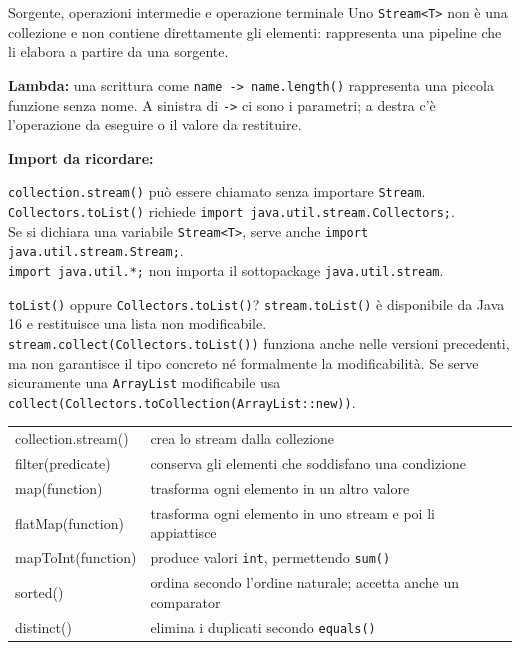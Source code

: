 ﻿\documentclass[10pt,a4paper]{article}
\newcommand{\cmd}[1]{\texttt{#1}}
\begin{document}
\begin{concept}{Sorgente, operazioni intermedie e operazione terminale}
Uno \cmd{Stream<T>} non è una collezione e non contiene direttamente gli
elementi: rappresenta una pipeline che li elabora a partire da una sorgente.

\textbf{Lambda:} una scrittura come \cmd{name -> name.length()} rappresenta
una piccola funzione senza nome. A sinistra di \cmd{->} ci sono i parametri;
a destra c'è l'operazione da eseguire o il valore da restituire.

\textbf{Import da ricordare:}

\cmd{collection.stream()} può essere chiamato senza importare \cmd{Stream}.\\
\cmd{Collectors.toList()} richiede
\cmd{import java.util.stream.Collectors;}.\\
Se si dichiara una variabile \cmd{Stream<T>}, serve anche
\cmd{import java.util.stream.Stream;}.\\
\cmd{import java.util.*;} non importa il sottopackage \cmd{java.util.stream}.

\begin{examtrap}{\texttt{toList()} oppure \texttt{Collectors.toList()}?}
\cmd{stream.toList()} è disponibile da Java 16 e restituisce una lista non
modificabile. \cmd{stream.collect(Collectors.toList())} funziona anche nelle
versioni precedenti, ma non garantisce il tipo concreto né formalmente la
modificabilità. Se serve sicuramente una \cmd{ArrayList} modificabile usa
\cmd{collect(Collectors.toCollection(ArrayList::new))}.
\end{examtrap}

\begin{tabularx}{\textwidth}{>{\ttfamily\small}p{4.2cm} X}
collection.stream() & crea lo stream dalla collezione \\
filter(predicate) & conserva gli elementi che soddisfano una condizione \\
map(function) & trasforma ogni elemento in un altro valore \\
flatMap(function) & trasforma ogni elemento in uno stream e poi li appiattisce \\
mapToInt(function) & produce valori \cmd{int}, permettendo \cmd{sum()} \\
sorted() & ordina secondo l'ordine naturale; accetta anche un comparator \\
distinct() & elimina i duplicati secondo \cmd{equals()} \\
\end{tabularx}
\end{concept}
\end{document}
